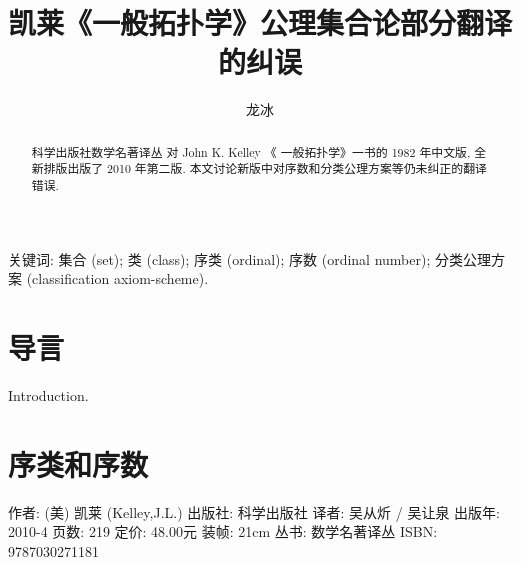 \documentclass[zihao=-4,heading=true,a4paper]{ctexart}
\title{凯莱《一般拓扑学》公理集合论部分翻译的纠误}
\author{龙\quad 冰}
\date{}
\begin{document}
\maketitle
\begin{abstract}
科学出版社数学名著译丛 对 John K. Kelley 《 一般拓扑学》一书的 1982 年中文版, 全新排版出版了 2010 年第二版.
本文讨论新版中对序数和分类公理方案等仍未纠正的翻译错误.
\end{abstract}
	
关键词: 集合 (set); 类 (class); 序类 (ordinal); 
	序数 (ordinal number); 
	分类公理方案 (classification axiom-scheme).
	
	
	
\section{导言}
	Introduction.
	
\section{序类和序数 }
	
	
	
	作者: (美) 凯莱 (Kelley,J.L.)
	出版社: 科学出版社
	译者: 吴从炘 / 吴让泉 
	出版年: 2010-4
	页数: 219
	定价: 48.00元
	装帧: 21cm
	丛书: 数学名著译丛
	ISBN: 9787030271181
\end{document}
